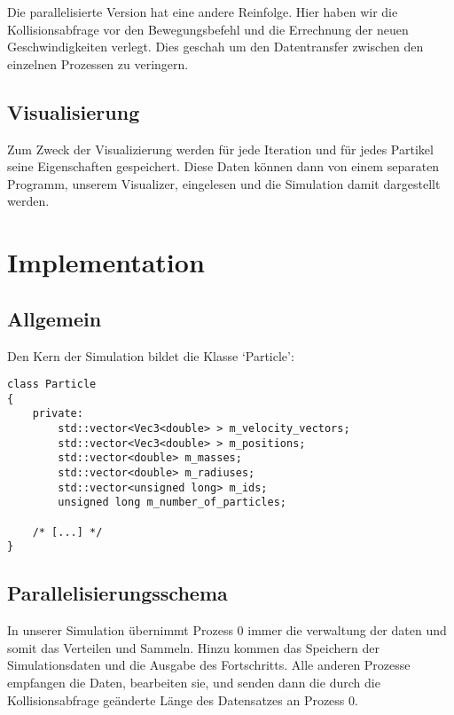Die parallelisierte Version hat eine andere Reinfolge.
Hier haben wir die Kollisionsabfrage vor den Bewegungsbefehl und die Errechnung
der neuen Geschwindigkeiten verlegt. Dies geschah um den Datentransfer zwischen
den einzelnen Prozessen zu veringern.

\subsection{Visualisierung}
Zum Zweck der Visualizierung werden für jede Iteration und für jedes Partikel seine
Eigenschaften gespeichert. Diese Daten können dann von einem separaten Programm,
unserem Visualizer, eingelesen und die Simulation damit dargestellt werden.


\section{Implementation}
\subsection{Allgemein}
Den Kern der Simulation bildet die Klasse `Particle':
\begin{verbatim}
class Particle
{
    private:
        std::vector<Vec3<double> > m_velocity_vectors;
        std::vector<Vec3<double> > m_positions;
        std::vector<double> m_masses;
        std::vector<double> m_radiuses;
        std::vector<unsigned long> m_ids;
        unsigned long m_number_of_particles;

    /* [...] */
}
\end{verbatim}

\subsection{Parallelisierungsschema}
In unserer Simulation übernimmt Prozess 0 immer die verwaltung der daten und somit das Verteilen
und Sammeln. Hinzu kommen das Speichern der Simulationsdaten und die Ausgabe des Fortschritts.
Alle anderen Prozesse empfangen die Daten, bearbeiten sie, und senden dann die
durch die Kollisionsabfrage geänderte Länge des Datensatzes an Prozess 0.

\newpage

